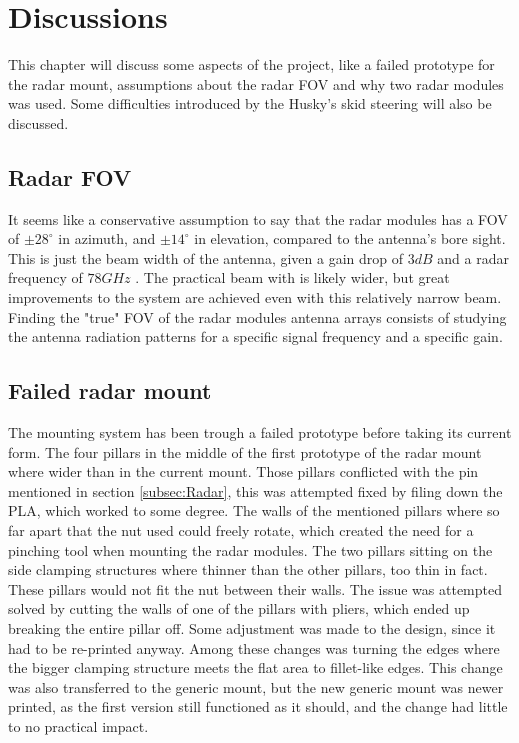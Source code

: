 \chapter{Discussions}\label{chap:Discussions}
This chapter will discuss some aspects of the project, like a failed prototype for the radar mount, assumptions about the radar FOV and why two radar modules was used. Some difficulties introduced by the Husky's skid steering will also be discussed. 

\section{Radar FOV}
It seems like a conservative assumption to say that the radar modules has a FOV of $\pm 28^\circ$ in azimuth, and  $\pm 14^\circ$ in elevation, compared to the antenna's bore sight. This is just the beam width of the antenna, given a gain drop of $3 dB$ and a radar frequency of $78 GHz$ \cite{xWR1843EvalModule}. The practical beam with is likely wider, but great improvements to the system are achieved even with this relatively narrow beam. %
Finding the "true" FOV of the radar modules antenna arrays consists of studying the antenna radiation patterns for a specific signal frequency and a specific gain.

\section{Failed radar mount}
The mounting system has been trough a failed prototype before taking its current form. The four pillars in the middle of the first prototype of the radar mount where wider than in the current mount. Those pillars conflicted with the pin mentioned in section \ref{subsec:Radar}, this was attempted fixed by filing down the PLA, which worked to some degree. The walls of the mentioned pillars where so far apart that the nut used could freely rotate, which created the need for a pinching tool when mounting the radar modules. The two pillars sitting on the side clamping structures where thinner than the other pillars, too thin in fact. These pillars would not fit the nut between their walls. The issue was attempted solved by cutting the walls of one of the pillars with pliers, which ended up breaking the entire pillar off. Some adjustment was made to the design, since it had to be re-printed anyway. Among these changes was turning the edges where the bigger clamping structure meets the flat area to fillet-like edges. This change was also transferred to the generic mount, but the new generic mount was newer printed, as the first version still functioned as it should, and the change had little to no practical impact.

